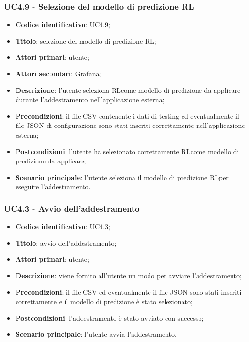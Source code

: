 \subsubsection{UC4.9 - Selezione del modello di predizione RL}
\begin{itemize}
	\item \textbf{Codice identificativo}: UC4.9;
	\item \textbf{Titolo}: selezione del modello di predizione RL\glo;
	\item \textbf{Attori primari}: utente;
	\item \textbf{Attori secondari}: Grafana\glo;
	\item \textbf{Descrizione}: l'utente seleziona RL\glosp come modello di predizione da applicare durante l'addestramento nell'applicazione esterna;
	\item \textbf{Precondizioni}: il file CSV contenente i dati di testing ed eventualmente il file JSON di configurazione sono stati inseriti correttamente nell'applicazione esterna;
	\item \textbf{Postcondizioni}: l'utente ha selezionato correttamente RL\glosp come modello di predizione da applicare;
	\item \textbf{Scenario principale}: l'utente seleziona il modello di predizione RL\glosp per eseguire l'addestramento.
\end{itemize}

\subsubsection{UC4.3 - Avvio dell'addestramento}
\begin{itemize}
    \item \textbf{Codice identificativo}: UC4.3;
    \item \textbf{Titolo}: avvio dell'addestramento;
    \item \textbf{Attori primari}: utente;
    \item \textbf{Descrizione}: viene fornito all'utente un modo per avviare l'addestramento;
    \item \textbf{Precondizioni}: il file CSV ed eventualmente il file JSON sono stati inseriti correttamente e il modello di predizione è stato selezionato;
    \item \textbf{Postcondizioni}: l'addestramento è stato avviato con successo;
    \item \textbf{Scenario principale}: l'utente avvia l'addestramento.
\end{itemize}

